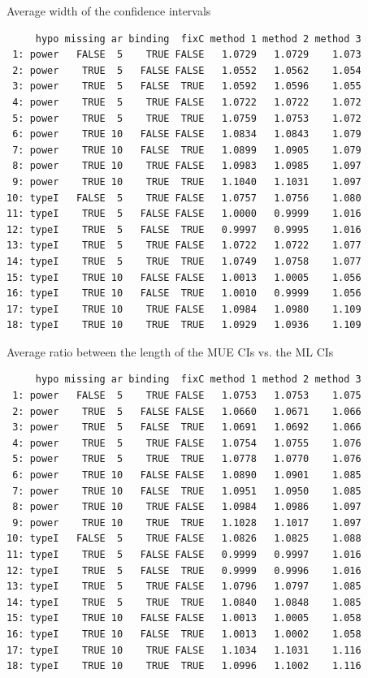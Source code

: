 \documentclass[12pt]{article}
\begin{document}
Average width of the confidence intervals
\begin{verbatim}
     hypo missing ar binding  fixC method 1 method 2 method 3
 1: power   FALSE  5    TRUE FALSE   1.0729   1.0729    1.073
 2: power    TRUE  5   FALSE FALSE   1.0552   1.0562    1.054
 3: power    TRUE  5   FALSE  TRUE   1.0592   1.0596    1.055
 4: power    TRUE  5    TRUE FALSE   1.0722   1.0722    1.072
 5: power    TRUE  5    TRUE  TRUE   1.0759   1.0753    1.072
 6: power    TRUE 10   FALSE FALSE   1.0834   1.0843    1.079
 7: power    TRUE 10   FALSE  TRUE   1.0899   1.0905    1.079
 8: power    TRUE 10    TRUE FALSE   1.0983   1.0985    1.097
 9: power    TRUE 10    TRUE  TRUE   1.1040   1.1031    1.097
10: typeI   FALSE  5    TRUE FALSE   1.0757   1.0756    1.080
11: typeI    TRUE  5   FALSE FALSE   1.0000   0.9999    1.016
12: typeI    TRUE  5   FALSE  TRUE   0.9997   0.9995    1.016
13: typeI    TRUE  5    TRUE FALSE   1.0722   1.0722    1.077
14: typeI    TRUE  5    TRUE  TRUE   1.0749   1.0758    1.077
15: typeI    TRUE 10   FALSE FALSE   1.0013   1.0005    1.056
16: typeI    TRUE 10   FALSE  TRUE   1.0010   0.9999    1.056
17: typeI    TRUE 10    TRUE FALSE   1.0984   1.0980    1.109
18: typeI    TRUE 10    TRUE  TRUE   1.0929   1.0936    1.109
\end{verbatim}

Average ratio between the length of the MUE CIs vs. the ML CIs
\begin{verbatim}
     hypo missing ar binding  fixC method 1 method 2 method 3
 1: power   FALSE  5    TRUE FALSE   1.0753   1.0753    1.075
 2: power    TRUE  5   FALSE FALSE   1.0660   1.0671    1.066
 3: power    TRUE  5   FALSE  TRUE   1.0691   1.0692    1.066
 4: power    TRUE  5    TRUE FALSE   1.0754   1.0755    1.076
 5: power    TRUE  5    TRUE  TRUE   1.0778   1.0770    1.076
 6: power    TRUE 10   FALSE FALSE   1.0890   1.0901    1.085
 7: power    TRUE 10   FALSE  TRUE   1.0951   1.0950    1.085
 8: power    TRUE 10    TRUE FALSE   1.0984   1.0986    1.097
 9: power    TRUE 10    TRUE  TRUE   1.1028   1.1017    1.097
10: typeI   FALSE  5    TRUE FALSE   1.0826   1.0825    1.088
11: typeI    TRUE  5   FALSE FALSE   0.9999   0.9997    1.016
12: typeI    TRUE  5   FALSE  TRUE   0.9999   0.9996    1.016
13: typeI    TRUE  5    TRUE FALSE   1.0796   1.0797    1.085
14: typeI    TRUE  5    TRUE  TRUE   1.0840   1.0848    1.085
15: typeI    TRUE 10   FALSE FALSE   1.0013   1.0005    1.058
16: typeI    TRUE 10   FALSE  TRUE   1.0013   1.0002    1.058
17: typeI    TRUE 10    TRUE FALSE   1.1034   1.1031    1.116
18: typeI    TRUE 10    TRUE  TRUE   1.0996   1.1002    1.116
\end{verbatim}
\end{document}
